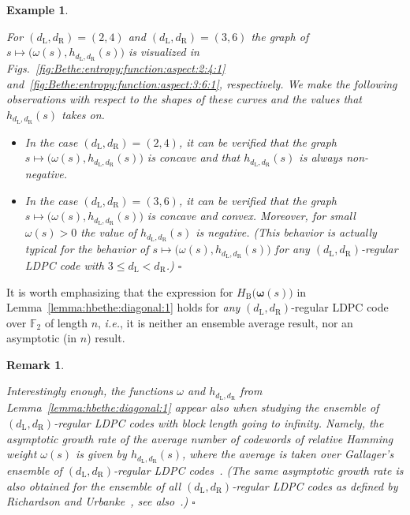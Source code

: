 \documentclass[journal, twocolumn]{IEEEtran}
\newcommand{\ie}{\emph{i.e.}}
\renewcommand{\leq}{\leqslant}
\newcommand{\GF}[1]{\mathbb{F}_{#1}}
\newcommand{\vomega}{\boldsymbol{\omega}}
\newcommand{\dleft}{d_{\mathrm{L}}}
\newcommand{\dright}{d_{\mathrm{R}}}
\newcommand{\HBethe}{H_{\mathrm{B}}}
\newcommand{\?}{\mathrm{?}}
\newcommand{\qedwhite}{\hspace*{\fill}%
  $\square$\smallskip}
\newcommand{\exampleend}{\qedwhite}
\newcommand{\remarkend}{\qedwhite}
\newtheorem{Remark}[Lemma]{Remark}
\newtheorem{Example}[Lemma]{Example}
\begin{document}
\begin{Example}
  \label{example:induced:Bethe:entropy:plot:1}

  For $(\dleft,\dright) = (2,4)$ and $(\dleft,\dright) = (3,6)$ the graph of
  $s \mapsto \bigl( \omega(s), h_{\dleft,\dright}(s) \bigr)$ is visualized in
  Figs.~\ref{fig:Bethe:entropy:function:aspect:2:4:1}
  and~\ref{fig:Bethe:entropy:function:aspect:3:6:1}, respectively. We make the
  following observations with respect to the shapes of these curves and the
  values that $h_{\dleft,\dright}(s)$ takes on.
  \begin{itemize}
    
  \item In the case $(\dleft,\dright) = (2,4)$, it can be verified that the
    graph $s \mapsto \bigl( \omega(s), h_{\dleft,\dright}(s) \bigr)$ is
    concave and that $h_{\dleft,\dright}(s)$ is always non-negative.

  \item In the case $(\dleft,\dright) = (3,6)$, it can be verified that the
    graph $s \mapsto \bigl( \omega(s), h_{\dleft,\dright}(s) \bigr)$ is
    concave and convex. Moreover, for small $\omega(s) > 0$ the value of
    $h_{\dleft,\dright}(s)$ is negative. (This behavior is actually typical
    for the behavior of $s \mapsto \bigl( \omega(s), h_{\dleft,\dright}(s)
    \bigr)$ for any $(\dleft,\dright)$-regular LDPC code with $3 \leq \dleft <
    \dright$.) \exampleend

  \end{itemize}
\end{Example}


It is worth emphasizing that the expression for $\HBethe\big( \vomega(s)
\big)$ in Lemma~\ref{lemma:hbethe:diagonal:1} holds for \emph{any}
$(\dleft,\dright)$-regular LDPC code over $\GF{2}$ of length $n$, \ie, it is
neither an ensemble average result, nor an asymptotic (in $n$) result.


\begin{Remark}
  \label{remark:asymptotic:growth:rate:Hamming:weight:spectrum:1}

  Interestingly enough, the functions $\omega$ and $h_{\dleft,\dright}$ from
  Lemma~\ref{lemma:hbethe:diagonal:1} appear also when studying the ensemble
  of $(\dleft,\dright)$-regular LDPC codes with block length going to
  infinity. Namely, the asymptotic growth rate of the average number of
  codewords of relative Hamming weight $\omega(s)$ is given by
  $h_{\dleft,\dright}(s)$, where the average is taken over Gallager's ensemble
  of $(\dleft,\dright)$-regular LDPC codes~\cite[Section~2]{Gallager:63}. (The
  same asymptotic growth rate is also obtained for the ensemble of all
  $(\dleft,\dright)$-regular LDPC codes as defined by Richardson and
  Urbanke~\cite{Richardson:Urbanke:01:2}, see
  also~\cite{Richardson:Urbanke:08:1, Litsyn:Shevelev:02:1,
    Di:Montanari:Urbanke:04:1}.) \remarkend
\end{Remark}
\end{document}
